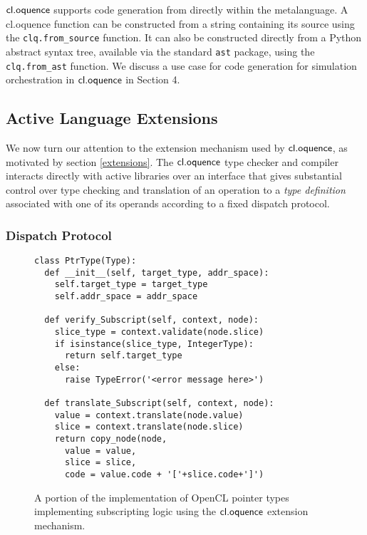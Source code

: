\documentclass{llncs}
\begin{document}
$\textsf{cl.oquence}$ supports code generation from directly within the metalanguage. A cl.oquence function can be constructed from a string containing its source using the \verb|clq.from_source| function. It can also be constructed directly from a Python abstract syntax tree, available via the standard \verb|ast| package, using the \verb|clq.from_ast| function. We discuss a use case for code generation for simulation orchestration in $\textsf{cl.oquence}$ in Section 4.

\subsection{Active Language Extensions}
We now turn our attention to the extension mechanism used by $\textsf{cl.oquence}$, as motivated by section \ref{extensions}. The $\textsf{cl.oquence}$ type checker and compiler interacts directly with active libraries over an interface that gives substantial control over type checking and translation of an operation to a {\it type definition} associated with one of its operands according to a fixed dispatch protocol.

\subsubsection{Dispatch Protocol}
\begin{figure}\small{
\begin{verbatim}
class PtrType(Type):
  def __init__(self, target_type, addr_space):
    self.target_type = target_type
    self.addr_space = addr_space
        
  def verify_Subscript(self, context, node):
    slice_type = context.validate(node.slice)
    if isinstance(slice_type, IntegerType):
      return self.target_type
    else: 
      raise TypeError('<error message here>')
       
  def translate_Subscript(self, context, node):
    value = context.translate(node.value)
    slice = context.translate(node.slice)
    return copy_node(node, 
      value = value,
      slice = slice,    
      code = value.code + '['+slice.code+']')
\end{verbatim}}
\caption{A portion of the implementation of OpenCL pointer types implementing subscripting logic using the $\textsf{cl.oquence}$ extension mechanism.}
\label{pointers}
\end{figure}
\end{document}
